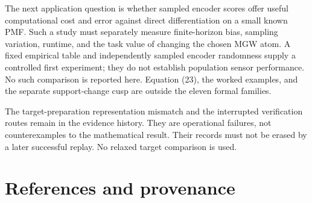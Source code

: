 \documentclass[11pt,a4paper]{article}
\begin{document}
The next application question is whether sampled encoder scores offer useful computational cost and error against direct differentiation on a small known PMF. Such a study must separately measure finite-horizon bias, sampling variation, runtime, and the task value of changing the chosen MGW atom. A fixed empirical table and independently sampled encoder randomness supply a controlled first experiment; they do not establish population sensor performance. No such comparison is reported here. Equation (23), the worked examples, and the separate support-change cusp are outside the eleven formal families.

The target-preparation representation mismatch and the interrupted verification routes remain in the evidence history. They are operational failures, not counterexamples to the mathematical result. Their records must not be erased by a later successful replay. No relaxed target comparison is used.

\section{References and provenance}\label{references-and-provenance}
\end{document}
